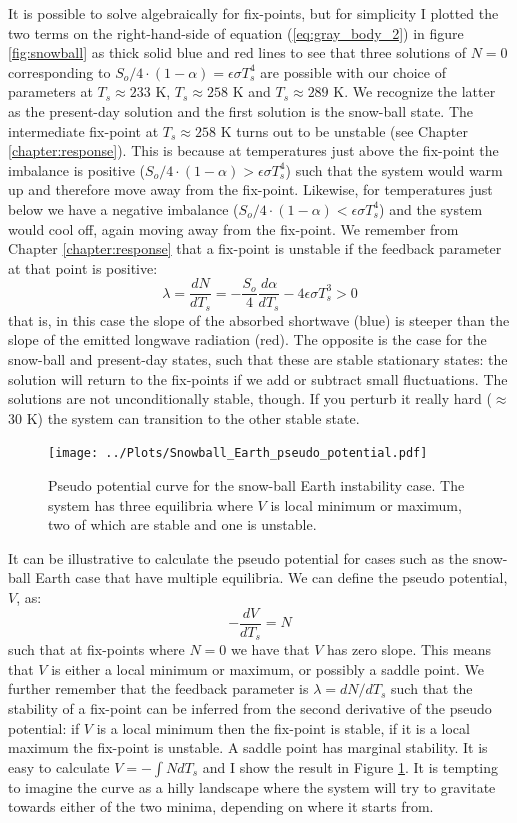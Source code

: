 \documentclass[12pt]{book}
\begin{document}
It is possible to solve algebraically for fix-points, but for simplicity I plotted the two terms on the right-hand-side of equation (\ref{eq:gray_body_2}) in figure \ref{fig:snowball} as thick solid blue and red lines to see that three solutions of $N=0$ corresponding to $S_o/4\cdot(1-\alpha)=\epsilon \sigma T_s^4$ are possible with our choice of parameters at $T_s \approx 233$ K,  $T_s \approx 258$ K and  $T_s \approx 289$ K. We recognize the latter as the present-day solution and the first solution is the snow-ball state. 
The intermediate fix-point at $T_s \approx 258$ K turns out to be unstable (see Chapter \ref{chapter:response}). This is because at temperatures just above the fix-point the imbalance is positive ($S_o/4\cdot(1-\alpha) > \epsilon \sigma T_s^4$) such that the system would warm up and therefore move away from the fix-point. Likewise, for temperatures just below we have a negative imbalance ($S_o/4\cdot(1-\alpha) < \epsilon \sigma T_s^4$) and the system would cool off, again moving away from the fix-point. We remember from Chapter \ref{chapter:response} that a fix-point is unstable if the feedback parameter at that point is positive: 
\[
\lambda = \frac{dN}{dT_s} = -\frac{S_o}{4}\frac{d\alpha}{dT_s}-4\epsilon \sigma T_s^3 > 0
\]
that is, in this case the slope of the absorbed shortwave (blue) is steeper than the slope of the emitted longwave radiation (red). The opposite is the case for the snow-ball and present-day states, such that these are stable stationary states: the solution will return to the fix-points if we add or subtract small fluctuations. The solutions are not unconditionally stable, though. If you perturb it really hard ($\approx$ 30 K) the system can transition to the other stable state. 

\begin{figure}
\begin{center}
\texttt{[image: ../Plots/Snowball\_Earth\_pseudo\_potential.pdf]}
\end{center}
\caption{ Pseudo potential curve for the snow-ball Earth instability case. The system has three equilibria where $V$ is local minimum or maximum, two of which are stable and one is unstable.  } 
\label{fig:snowball_pseudo_potential}
\end{figure}

It can be illustrative to calculate the pseudo potential for cases such as the snow-ball Earth case that have multiple equilibria. We can define the pseudo potential, $V$, as:
\[
-\frac{dV}{dT_s} = N
\]
such that at fix-points where $N=0$ we have that $V$ has zero slope. This means that $V$ is either a local minimum or maximum, or possibly a saddle point. We further remember that the feedback parameter is $\lambda = dN/dT_s$ such that the stability of a fix-point can be inferred from the second derivative of the pseudo potential: if $V$ is a local minimum then the fix-point is stable, if it is a local maximum the fix-point is unstable. A saddle point has marginal stability. It is easy to calculate $V=-\int N dT_s$ and I show the result in Figure \ref{fig:snowball_pseudo_potential}. It is tempting to imagine the curve as a hilly landscape where the system will try to gravitate towards either of the two minima, depending on where it starts from. 
\end{document}
